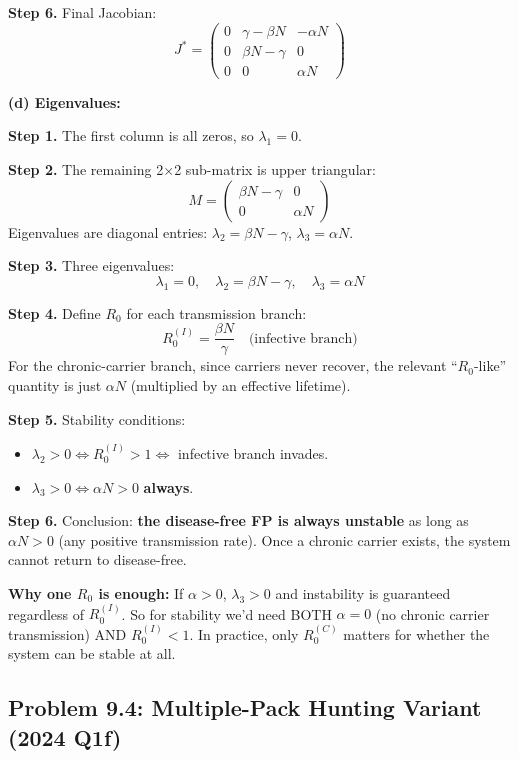\documentclass[10pt]{article}
\begin{document}
\begin{solution}
\textbf{Step 6.} Final Jacobian:
\[
J^* = \begin{pmatrix} 0 & \gamma - \beta N & -\alpha N \\ 0 & \beta N - \gamma & 0 \\ 0 & 0 & \alpha N \end{pmatrix}
\]

\medskip\textbf{(d) Eigenvalues:}

\textbf{Step 1.} The first column is all zeros, so $\lambda_1 = 0$.

\textbf{Step 2.} The remaining 2$\times$2 sub-matrix is upper triangular:
\[
M = \begin{pmatrix} \beta N - \gamma & 0 \\ 0 & \alpha N \end{pmatrix}
\]
Eigenvalues are diagonal entries: $\lambda_2 = \beta N - \gamma$, $\lambda_3 = \alpha N$.

\textbf{Step 3.} Three eigenvalues:
\[
\boxed{\lambda_1 = 0, \quad \lambda_2 = \beta N - \gamma, \quad \lambda_3 = \alpha N}
\]

\textbf{Step 4.} Define $R_0$ for each transmission branch:
\[
R_0^{(I)} = \frac{\beta N}{\gamma} \quad\text{(infective branch)}
\]
For the chronic-carrier branch, since carriers never recover, the relevant ``$R_0$-like'' quantity is just $\alpha N$ (multiplied by an effective lifetime).

\textbf{Step 5.} Stability conditions:
\begin{itemize}
\item $\lambda_2 > 0 \iff R_0^{(I)} > 1 \iff$ infective branch invades.
\item $\lambda_3 > 0 \iff \alpha N > 0$ \textbf{always}.
\end{itemize}

\textbf{Step 6.} Conclusion: \textbf{the disease-free FP is always unstable} as long as $\alpha N > 0$ (any positive transmission rate). Once a chronic carrier exists, the system cannot return to disease-free.

\textbf{Why one $R_0$ is enough:} If $\alpha > 0$, $\lambda_3 > 0$ and instability is guaranteed regardless of $R_0^{(I)}$. So for stability we'd need BOTH $\alpha = 0$ (no chronic carrier transmission) AND $R_0^{(I)} < 1$. In practice, only $R_0^{(C)}$ matters for whether the system can be stable at all.
\end{solution}

\subsection{Problem 9.4: Multiple-Pack Hunting Variant (2024 Q1f)}
\end{document}
